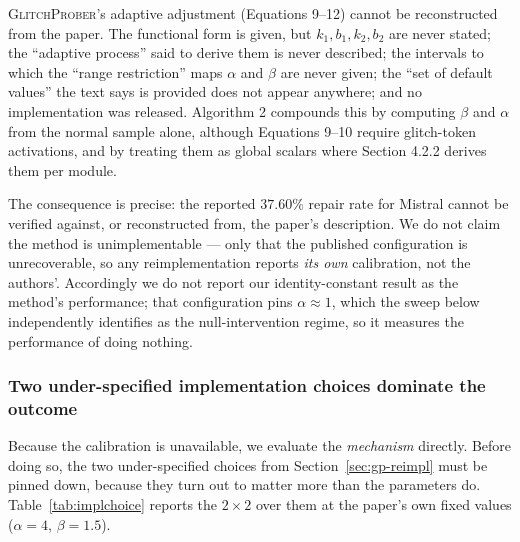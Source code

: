 \documentclass[11pt,a4paper]{article}
\newcommand{\gp}{\textsc{GlitchProber}}
\begin{document}
\gp{}'s adaptive adjustment (Equations 9--12) cannot be reconstructed from the
paper. The functional form is given, but $k_1, b_1, k_2, b_2$ are never stated;
the ``adaptive process'' said to derive them is never described; the intervals to
which the ``range restriction'' maps $\alpha$ and $\beta$ are never given; the
``set of default values'' the text says is provided does not appear anywhere; and
no implementation was released. Algorithm 2 compounds this by computing $\beta$
and $\alpha$ from the normal sample alone, although Equations 9--10 require
glitch-token activations, and by treating them as global scalars where
Section 4.2.2 derives them per module.

The consequence is precise: the reported $37.60\%$ repair rate for Mistral cannot
be verified against, or reconstructed from, the paper's description. We do not
claim the method is unimplementable --- only that the published configuration is
unrecoverable, so any reimplementation reports \emph{its own} calibration, not the
authors'. Accordingly we do not report our identity-constant result as the
method's performance; that configuration pins $\alpha \approx 1$, which the sweep
below independently identifies as the null-intervention regime, so it measures the
performance of doing nothing.

\subsubsection{Two under-specified implementation choices dominate the outcome}

Because the calibration is unavailable, we evaluate the \emph{mechanism} directly.
Before doing so, the two under-specified choices from Section~\ref{sec:gp-reimpl}
must be pinned down, because they turn out to matter more than the parameters do.
Table~\ref{tab:implchoice} reports the $2\times2$ over them at the paper's own
fixed values ($\alpha = 4$, $\beta = 1.5$).
\end{document}

